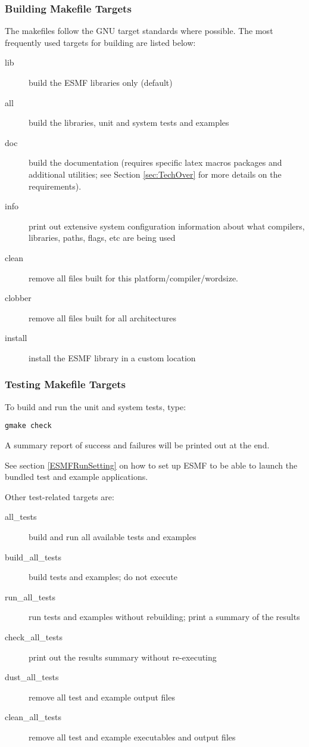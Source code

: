 \subsubsection{Building Makefile Targets}

The makefiles follow the GNU target standards where possible.
The most frequently used targets for building are listed below:
\begin{description}
\item[lib] build the ESMF libraries only (default)
\item[all] build the libraries, unit and system tests and examples
\item[doc] build the documentation (requires specific latex macros packages
and additional utilities; see Section \ref{sec:TechOver} for more details
on the requirements).  
\item[info] print out extensive system configuration information about what
           compilers, libraries, paths, flags, etc are being used
\item[clean] remove all files built for this platform/compiler/wordsize.
\item[clobber] remove all files built for all architectures
\item[install] install the ESMF library in a custom location
\end{description}


\subsubsection{Testing Makefile Targets}

To build and run the unit and system tests, type:
\begin{verbatim}
gmake check
\end{verbatim}
A summary report of success and failures will be printed out at the end.

See section \ref{ESMFRunSetting} on how to set up ESMF to be able to launch
the bundled test and example applications.

\noindent Other test-related targets are:
\begin{description}
\item[all\_tests] build and run all available tests and examples
\item[build\_all\_tests] build tests and examples; do not execute
\item[run\_all\_tests] run tests and examples without rebuilding; print a
summary of the results
\item[check\_all\_tests] print out the results summary without re-executing
\item[dust\_all\_tests] remove all test and example output files
\item[clean\_all\_tests] remove all test and example executables and output
files
\end{description}

